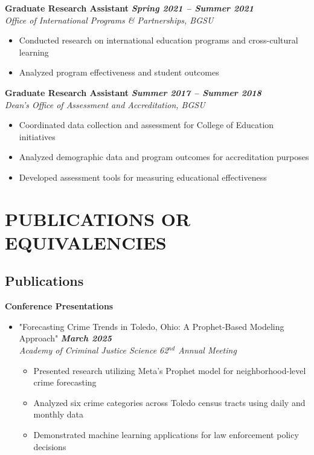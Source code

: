 \documentclass[11pt,letterpaper]{article}
\begin{document}
\textbf{Graduate Research Assistant} \hfill \textbf{\textit{Spring 2021 -- Summer 2021}} \\
\textit{Office of International Programs \& Partnerships, BGSU}
\begin{itemize}
    \item Conducted research on international education programs and cross-cultural learning
    \item Analyzed program effectiveness and student outcomes
\end{itemize}

\textbf{Graduate Research Assistant} \hfill \textbf{\textit{Summer 2017 -- Summer 2018}} \\
\textit{Dean's Office of Assessment and Accreditation, BGSU}
\begin{itemize}
    \item Coordinated data collection and assessment for College of Education initiatives
    \item Analyzed demographic data and program outcomes for accreditation purposes
    \item Developed assessment tools for measuring educational effectiveness
\end{itemize}

\section{PUBLICATIONS OR EQUIVALENCIES}

\subsection*{Publications}
   
\textbf{Conference Presentations}
\begin{itemize}
    \item "Forecasting Crime Trends in Toledo, Ohio: A Prophet-Based Modeling Approach" \hfill \textbf{\textit{March 2025}} \\
    \textit{Academy of Criminal Justice Science 62$^{nd}$ Annual Meeting}
    \begin{itemize}
        \item Presented research utilizing Meta's Prophet model for neighborhood-level crime forecasting
        \item Analyzed six crime categories across Toledo census tracts using daily and monthly data
        \item Demonstrated machine learning applications for law enforcement policy decisions
    \end{itemize}
\end{itemize}
\end{document}
